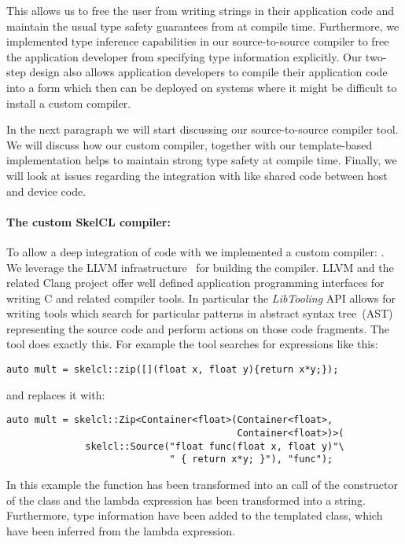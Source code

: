 This allows us to free the user from writing strings in their application code and maintain the usual type safety guarantees from \Cpp at compile time.
Furthermore, we implemented type inference capabilities in our source-to-source compiler to free the application developer from specifying type information explicitly.
Our two-step design also allows application developers to compile their application code into a form which then can be deployed on systems where it might be difficult to install a custom compiler.

In the next paragraph we will start discussing our source-to-source compiler tool.
We will discuss how our custom compiler, together with our template-based implementation helps to maintain strong type safety at compile time.
Finally, we will look at issues regarding the integration with \Cpp like shared code between host and device code.

\paragraph{The custom SkelCL compiler: }
To allow a deep integration of \SkelCL code with \Cpp we implemented a custom compiler: .
We leverage the LLVM infrastructure~\cite{Lattner2004} for building the compiler.
LLVM and the related Clang project offer well defined application programming interfaces for writing C and \Cpp related compiler tools.
In particular the \emph{LibTooling} API allows for writing tools which search for particular patterns in abstract syntax tree~(AST) representing the source code and perform actions on those code fragments.
The  tool does exactly this.
For example the tool searches for expressions like this:
\begin{lstlisting}[numbers=none,label={lst:skelclc:before},caption={Code snippet before transformation.}]
auto mult = skelcl::zip([](float x, float y){return x*y;});
\end{lstlisting}
and replaces it with:
\begin{lstlisting}[numbers=none,label={lst:skelclc:after},caption={Code snippet after transformation.}]
auto mult = skelcl::Zip<Container<float>(Container<float>,
                                         Container<float>)>(
              skelcl::Source("float func(float x, float y)"\
                             " { return x*y; }"), "func");
\end{lstlisting}

In this example the  function has been transformed into an call of the constructor of the  class and the lambda expression has been transformed into a string.
Furthermore, type information have been added to the templated \code{Zip} class, which have been inferred from the lambda expression.

